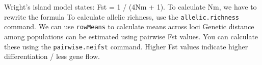 \documentclass[
  letterpaper,
  DIV=11,
  numbers=noendperiod]{scrreprt}
\begin{document}
\begin{tcolorbox}[enhanced jigsaw, arc=.35mm, left=2mm, titlerule=0mm, rightrule=.15mm, colframe=quarto-callout-tip-color-frame, coltitle=black, colback=white, opacityback=0, bottomtitle=1mm, bottomrule=.15mm, colbacktitle=quarto-callout-tip-color!10!white, breakable, title=\textcolor{quarto-callout-tip-color}{\faLightbulb}\hspace{0.5em}{Tip}, toptitle=1mm, toprule=.15mm, opacitybacktitle=0.6, leftrule=.75mm]

Wright's island model states: Fst = 1 / (4Nm + 1). To calculate Nm, we
have to rewrite the formula To calculate allelic richness, use the
\texttt{allelic.richness} command. We can use \texttt{rowMeans} to
calculate means across loci Genetic distance among populations can be
estimated using pairwise Fst values. You can calculate these using the
\texttt{pairwise.neifst} command. Higher Fst values indicate higher
differentiation / less gene flow.

\end{tcolorbox}
\end{document}
